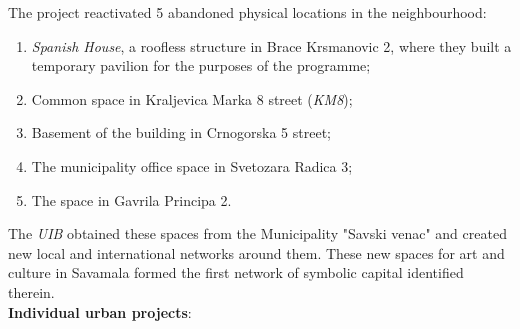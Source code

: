 \documentclass[11pt]{report}
\begin{document}
The project reactivated 5 abandoned physical locations in the neighbourhood:

\begin{enumerate}
\item \textit{Spanish House}, a roofless structure in Brace Krsmanovic 2, where they built a temporary pavilion for the purposes of the programme;

\item Common space in Kraljevica Marka 8 street (\textit{KM8});

\item Basement of the building in Crnogorska 5 street;

\item The municipality office space in Svetozara Radica 3;

\item The space in Gavrila Principa 2.
\end{enumerate}

The \textit{UIB} obtained these spaces from the Municipality "Savski venac" and created new local and international networks around them.
These new spaces for art and culture in Savamala formed the first network of symbolic capital identified therein.
\\
\textbf{Individual urban projects}:
\end{document}
